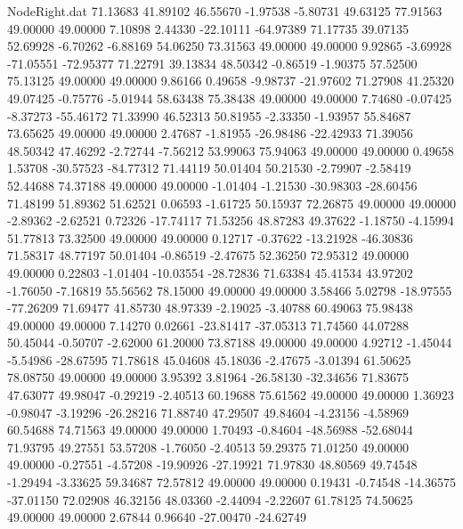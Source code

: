 \begin{filecontents}{NodeRight.dat}
  71.13683   41.89102   46.55670    -1.97538   -5.80731   49.63125   77.91563   49.00000   49.00000    7.10898    2.44330  -22.10111  -64.97389
  71.17735   39.07135   52.69928    -6.70262   -6.88169   54.06250   73.31563   49.00000   49.00000    9.92865   -3.69928  -71.05551  -72.95377
  71.22791   39.13834   48.50342    -0.86519   -1.90375   57.52500   75.13125   49.00000   49.00000    9.86166    0.49658   -9.98737  -21.97602
  71.27908   41.25320   49.07425    -0.75776   -5.01944   58.63438   75.38438   49.00000   49.00000    7.74680   -0.07425   -8.37273  -55.46172
  71.33990   46.52313   50.81955    -2.33350   -1.93957   55.84687   73.65625   49.00000   49.00000    2.47687   -1.81955  -26.98486  -22.42933
  71.39056   48.50342   47.46292    -2.72744   -7.56212   53.99063   75.94063   49.00000   49.00000    0.49658    1.53708  -30.57523  -84.77312
  71.44119   50.01404   50.21530    -2.79907   -2.58419   52.44688   74.37188   49.00000   49.00000   -1.01404   -1.21530  -30.98303  -28.60456
  71.48199   51.89362   51.62521     0.06593   -1.61725   50.15937   72.26875   49.00000   49.00000   -2.89362   -2.62521    0.72326  -17.74117
  71.53256   48.87283   49.37622    -1.18750   -4.15994   51.77813   73.32500   49.00000   49.00000    0.12717   -0.37622  -13.21928  -46.30836
  71.58317   48.77197   50.01404    -0.86519   -2.47675   52.36250   72.95312   49.00000   49.00000    0.22803   -1.01404  -10.03554  -28.72836
  71.63384   45.41534   43.97202    -1.76050   -7.16819   55.56562   78.15000   49.00000   49.00000    3.58466    5.02798  -18.97555  -77.26209
  71.69477   41.85730   48.97339    -2.19025   -3.40788   60.49063   75.98438   49.00000   49.00000    7.14270    0.02661  -23.81417  -37.05313
  71.74560   44.07288   50.45044    -0.50707   -2.62000   61.20000   73.87188   49.00000   49.00000    4.92712   -1.45044   -5.54986  -28.67595
  71.78618   45.04608   45.18036    -2.47675   -3.01394   61.50625   78.08750   49.00000   49.00000    3.95392    3.81964  -26.58130  -32.34656
  71.83675   47.63077   49.98047    -0.29219   -2.40513   60.19688   75.61562   49.00000   49.00000    1.36923   -0.98047   -3.19296  -26.28216
  71.88740   47.29507   49.84604    -4.23156   -4.58969   60.54688   74.71563   49.00000   49.00000    1.70493   -0.84604  -48.56988  -52.68044
  71.93795   49.27551   53.57208    -1.76050   -2.40513   59.29375   71.01250   49.00000   49.00000   -0.27551   -4.57208  -19.90926  -27.19921
  71.97830   48.80569   49.74548    -1.29494   -3.33625   59.34687   72.57812   49.00000   49.00000    0.19431   -0.74548  -14.36575  -37.01150
  72.02908   46.32156   48.03360    -2.44094   -2.22607   61.78125   74.50625   49.00000   49.00000    2.67844    0.96640  -27.00470  -24.62749

\end{filecontents}
